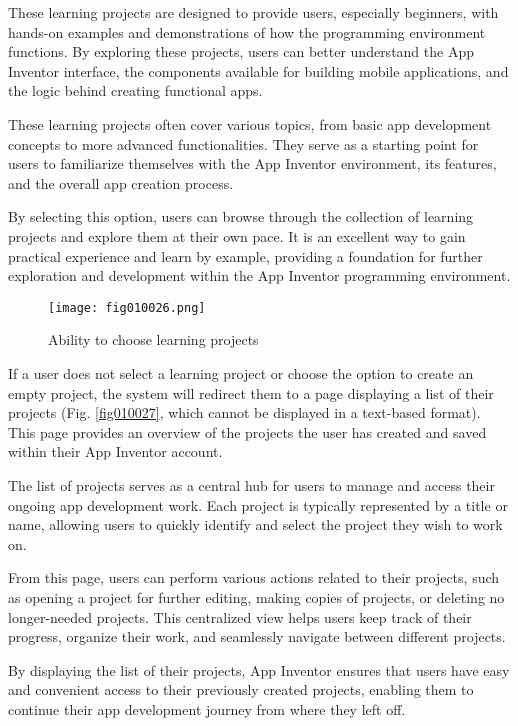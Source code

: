 These learning projects are designed to provide users, especially beginners, with hands-on examples and demonstrations of how the programming environment functions. By exploring these projects, users can better understand the App Inventor interface, the components available for building mobile applications, and the logic behind creating functional apps.

These learning projects often cover various topics, from basic app development concepts to more advanced functionalities. They serve as a starting point for users to familiarize themselves with the App Inventor environment, its features, and the overall app creation process.

By selecting this option, users can browse through the collection of learning projects and explore them at their own pace. It is an excellent way to gain practical experience and learn by example, providing a foundation for further exploration and development within the App Inventor programming environment.

\begin{figure}[H]
   \centering
   \texttt{[image: fig010026.png]}
   \caption{Ability to choose learning projects}
\label{fig010026}
\end{figure}

If a user does not select a learning project or choose the option to create an empty project, the system will redirect them to a page displaying a list of their projects (Fig. \ref{fig010027}, which cannot be displayed in a text-based format). This page provides an overview of the projects the user has created and saved within their App Inventor account.

The list of projects serves as a central hub for users to manage and access their ongoing app development work. Each project is typically represented by a title or name, allowing users to quickly identify and select the project they wish to work on.

From this page, users can perform various actions related to their projects, such as opening a project for further editing, making copies of projects, or deleting no longer-needed projects. This centralized view helps users keep track of their progress, organize their work, and seamlessly navigate between different projects.

By displaying the list of their projects, App Inventor ensures that users have easy and convenient access to their previously created projects, enabling them to continue their app development journey from where they left off.

